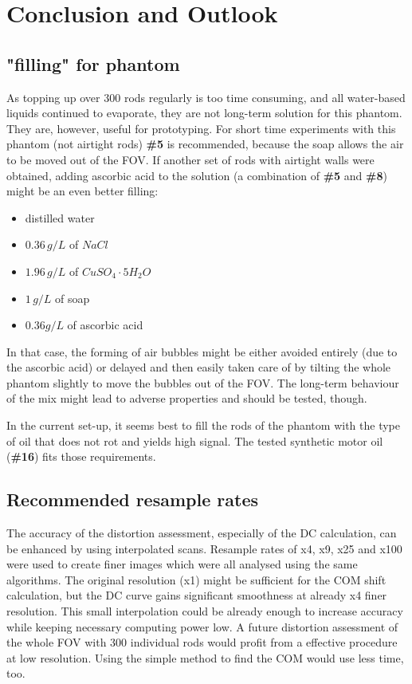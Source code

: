 
\chapter{Conclusion and Outlook}
\section{"filling" for phantom}
\label{sec:filling}

As topping up over 300 rods regularly is too time consuming, and all water-based liquids continued to evaporate, they are not long-term solution for this phantom.
They are, however, useful for prototyping.
For short time experiments with this phantom (not airtight rods) \textbf{\#5} is recommended, because the soap allows the air to be moved out of the FOV.
If another set of rods with airtight walls were obtained, adding ascorbic acid to the solution (a combination of \textbf{\#5} and \textbf{\#8}) might be an even better filling:
\begin{itemize}
\item  distilled water
\item  $0.36 \, g/L$ of $NaCl$
\item  $1.96 \, g/L$ of $CuSO_4\cdot5H_2O$
\item  $1 \, g/L$ of soap
\item  $0.36 g/L$ of ascorbic acid
\end{itemize}
In that case, the forming of air bubbles might be either avoided entirely (due to the ascorbic acid) or delayed and then easily taken care of by tilting the whole phantom slightly to move the bubbles out of the FOV.
The long-term behaviour of the mix might lead to adverse properties and should be tested, though.

In the current set-up, it seems best to fill the rods of the phantom with the type of oil that does not rot and yields high signal.
The tested synthetic motor oil (\textbf{\#16}) fits those requirements.

\section{Recommended resample rates}

The accuracy of the distortion assessment, especially of the DC calculation, can be enhanced by using interpolated scans.
Resample rates of x4, x9, x25 and x100 were used to create finer images which were all analysed using the same algorithms.
The original resolution (x1) might be sufficient for the COM shift calculation, but the DC curve gains significant smoothness at already x4 finer resolution.
This small interpolation could be already enough to increase accuracy while keeping necessary computing power low.
A future distortion assessment of the whole FOV with 300 individual rods would profit from a effective procedure at low resolution.
Using the simple method to find the COM would use less time, too.


